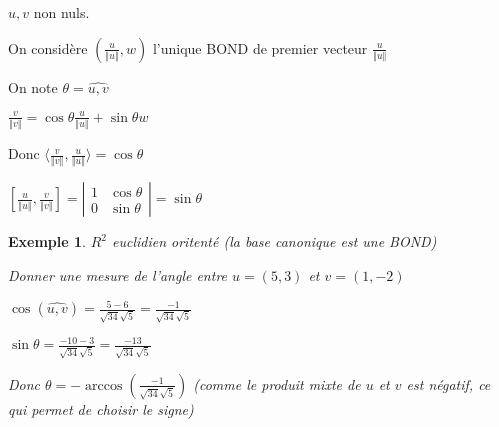 \documentclass[a4paper,12pt]{book}
\newcommand{\Pre}[1]{\begin{tcolorbox}[sharp corners, colback=white,colframe=green!60!green!30!black!75, title=Preuve]#1\end{tcolorbox}}
\newtheorem{Exe}{Exemple}[section]
\begin{document}
\Pre{$u,v$ non nuls.
\par On considère $(\frac{u}{\Vert u\Vert}, w)$ l'unique BOND de premier vecteur $\frac{u}{\Vert u\Vert}$
\par On note $\theta = \widehat{u,v}$
\par $\frac{v}{\Vert v\Vert} = \cos\theta\frac{u}{\Vert u\Vert}+\sin\theta w$
\par Donc $\langle \frac{v}{\Vert v\Vert}, \frac{u}{\Vert u\Vert}\rangle = \cos\theta$
\par $\left[\frac{u}{\Vert u\Vert}, \frac{v}{\Vert v\Vert}\right] = \left\vert\begin{matrix} 1 & \cos\theta \\ 0 & \sin\theta \end{matrix}\right\vert =\sin\theta$}
\begin{Exe}
$R^2$ euclidien oritenté (la base canonique est une BOND)
\par Donner une mesure de l'angle entre $u = (5,3)$ et $v=(1,-2)$
\par $\cos(\widehat{u,v}) = \frac{5-6}{\sqrt{34}\sqrt{5}}=\frac{-1}{\sqrt{34}\sqrt{5}}$
\par $\sin\theta = \frac{-10-3}{\sqrt{34}\sqrt{5}} = \frac{-13}{\sqrt{34}\sqrt{5}}$
\par Donc $\theta =-\arccos\left(\frac{-1}{\sqrt{34}\sqrt{5}}\right)$ (comme le produit mixte de $u$ et $v$ est négatif, ce qui permet de choisir le signe)
\end{Exe}
\end{document}
